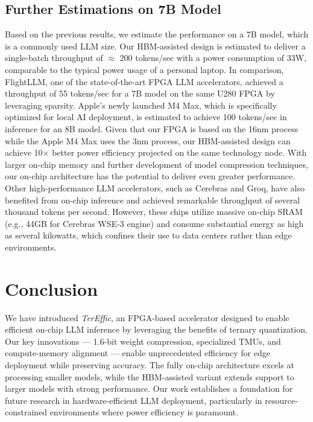 \subsection{Further Estimations on 7B Model}
 Based on the previous results, we estimate the performance on a 7B model, which is a commonly used LLM size. Our HBM-assisted design is estimated to deliver a single-batch throughput of $\approx$ 200 tokens/sec with a power consumption of 33W, comparable to the typical power usage of a personal laptop. 
 In comparison, FlightLLM\cite{flightllm}, one of the state-of-the-art FPGA LLM accelerators, achieved a throughput of 55 tokens/sec for a 7B model on the same U280 FPGA by leveraging sparsity. Apple’s newly launched M4 Max, which is specifically optimized for local AI deployment, is estimated to achieve 100 tokens/sec in inference for an 8B model\cite{AppleM4}. Given that our FPGA is based on the 16nm process while the Apple M4 Max uses the 3nm process, our HBM-assisted design can achieve 10$\times$ better power efficiency projected on the same technology node. With larger on-chip memory and further development of model compression techniques, our on-chip architecture has the potential to deliver even greater performance. 
 Other high-performance LLM accelerators, such as Cerebras\cite{cerebras_1} and Groq\cite{groq}, have also benefited from on-chip inference and achieved remarkable throughput of several thousand tokens per second\cite{cerebras_3}. However, these chips utilize massive on-chip SRAM (e.g., 44GB for Cerebras WSE-3 engine\cite{cerebras-2}) and consume substantial energy as high as several kilowatts, which confines their use to data centers rather than edge environments. 



\section{Conclusion}

We have introduced \textit{TerEffic}, an FPGA-based accelerator designed to enable efficient on-chip LLM inference by leveraging the benefits of ternary quantization. Our key innovations --- 1.6-bit weight compression, specialized TMUs, and compute-memory alignment --- enable unprecedented efficiency for edge deployment while preserving accuracy. The fully on-chip architecture excels at processing smaller models, while the HBM-assisted variant extends support to larger models with strong performance. Our work establishes a foundation for future research in hardware-efficient LLM deployment, particularly in resource-constrained environments where power efficiency is paramount.
\vspace{-0.5mm}
